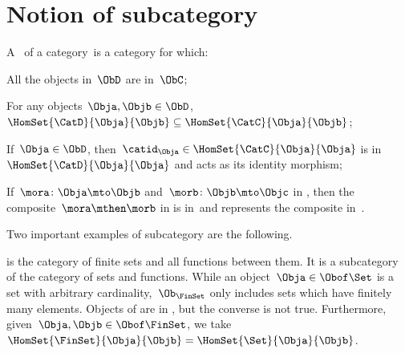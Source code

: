 \label{sec:specialization}

\section{Notion of subcategory}
\begin{ctdefinition}[Subcategory]
    \label{def:subcategory}
    A \emph{}~\CatD of a category~\CatC is a category for which:
    \begin{compactenum}
        \item All the objects in~$\ObD$ are in~$\ObC$;
        \item For any objects~$\Obja,\Objb\in \ObD$,~$\HomSet{\CatD}{\Obja}{\Objb}\subseteq \HomSet{\CatC}{ \Obja}{\Objb}$;
        \item If~$\Obja\in \ObD$, then~$\catid_\Obja \in \HomSet{\CatC}{\Obja}{\Obja}$ is in~$\HomSet{\CatD}{\Obja}{\Obja}$ and acts as its identity morphism;
        \item If~$\mora \colon \Obja \mto \Objb$ and~$\morb\colon \Objb\mto \Objc$ in \CatD, then the composite~$\mora \mthen \morb$ in \CatC is in~\CatD and represents the composite in~\CatD.
    \end{compactenum}
\end{ctdefinition}

Two important examples of subcategory are the following.

\begin{example}
    \label{ex:FinSet}
    \iindex{\FinSet} is the category of finite sets and all functions between them.
    It is a subcategory of the category \Set of sets and functions.
    While an object~$\Obja \in \Obof\Set$ is a set with arbitrary cardinality,~$\Ob_{\FinSet}$ only includes sets which have finitely many elements.
    Objects of \FinSet are in \Set, but the converse is not true.
    Furthermore, given~$\Obja,\Objb\in \Obof\FinSet$, we take~$\HomSet{\FinSet}{\Obja}{\Objb} =\HomSet{\Set}{\Obja}{\Objb}$.
\end{example}

